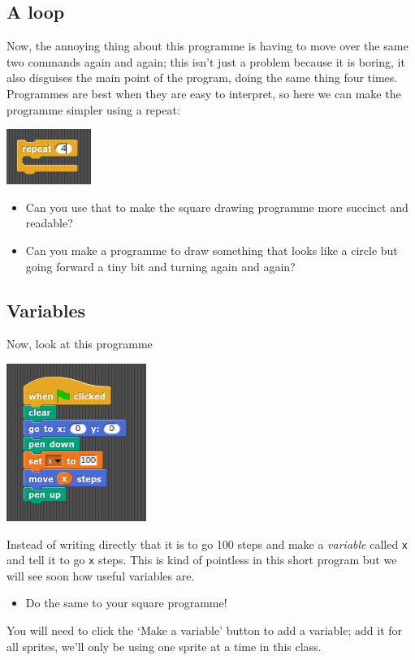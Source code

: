 \documentclass[11pt,a4paper]{scrartcl}
\begin{document}
\subsection*{A loop}

Now, the annoying thing about this programme is having to move over
the same two commands again and again; this isn't just a problem
because it is boring, it also disguises the main point of the program,
doing the same thing four times. Programmes are best when they are
easy to interpret, so here we can make the programme simpler using a
repeat:
\begin{center}
\includegraphics{repeat.png}
\end{center}
\begin{itemize}
\item Can you use that to make the square drawing programme more succinct and readable? 
\item Can you make a programme to draw something that looks like a circle but going forward a tiny bit and turning again and again?
\end{itemize}

\subsection*{Variables}

Now, look at this programme
\begin{center}
\includegraphics{variable.png}
\end{center}
Instead of writing directly that it is to go 100 steps and make a
\textsl{variable} called \texttt{x} and tell it to go \texttt{x}
steps. This is kind of pointless in this short program but we will see
soon how useful variables are. 
\begin{itemize}
\item Do the same to your square programme!
\end{itemize}
You will need to click the \lq{}Make a variable\rq{} button to add a
variable; add it for all sprites, we'll only be using one sprite at a
time in this class.
\end{document}
